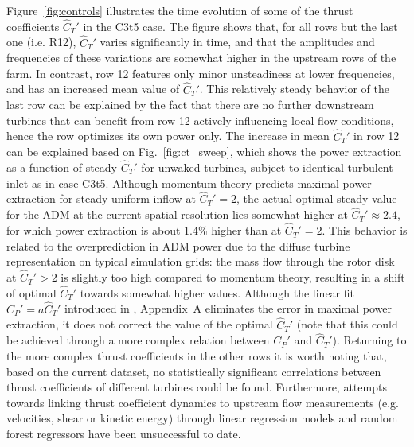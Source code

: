 \documentclass[wes, manuscript]{copernicus}
\newcommand{\cthat}{\widehat{C}_T'}
\begin{document}
Figure~\ref{fig:controls} illustrates the time evolution of some of  the thrust coefficients $\cthat$ in the C3t5 case. The figure shows that, for all rows but the last one (i.e. R12), $\cthat$ varies significantly in time, and that the amplitudes and frequencies of these variations are somewhat higher in the upstream rows of the farm. In contrast, row 12 features only minor unsteadiness at lower frequencies, and has an increased mean value of $\cthat$. This relatively steady behavior of the last row can be explained by the fact that there are no further downstream turbines that can benefit from row 12 actively influencing local flow conditions, hence the row optimizes its own power only. The increase in mean $\cthat$ in row 12 can be explained based on Fig.~\ref{fig:ct_sweep}, which shows the power extraction as a function of steady $\cthat$ for unwaked turbines, subject to identical turbulent inlet as in case C3t5. Although momentum theory predicts maximal power extraction for steady uniform inflow at $\cthat = 2$, the actual optimal steady value for the ADM at the current spatial resolution lies somewhat higher at $\cthat \approx 2.4$, for which power extraction is about 1.4\% higher than at $\cthat = 2$. This behavior is related to the overprediction in ADM power due to the diffuse turbine representation on typical simulation grids: the mass flow through the rotor disk at $\cthat > 2$ is slightly too high compared to momentum theory, resulting in a  shift of optimal $\cthat$ towards somewhat higher values. Although the linear fit $C_P' = a \cthat$ introduced in \cite{munters2017optimal}, Appendix~A eliminates the error in maximal power extraction, it does not correct the value of the optimal $\cthat$ (note that this could be achieved through a more complex relation between $C_P'$ and $\cthat$). Returning to the more complex thrust coefficients in the other rows it is worth noting that, based on the current dataset, no statistically significant correlations between thrust coefficients of different turbines could be found. Furthermore, attempts towards linking thrust coefficient dynamics to upstream flow measurements (e.g. velocities, shear or kinetic energy) through linear regression models and random forest regressors have been unsuccessful to date. 
\end{document}
